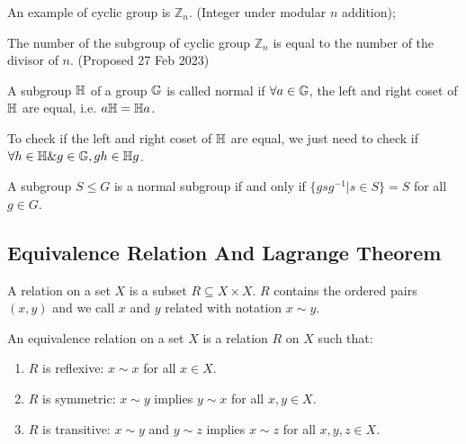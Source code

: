\documentclass[../note.tex]{subfiles}
\begin{document}
\begin{example}
An example of cyclic group is $\mathbb{Z}_n$. (Integer under modular $n$ addition);
\end{example}

\begin{proposition}
	The number of the subgroup of cyclic group $\mathbb{Z}_n$ is equal to the number of the divisor of $n$. (Proposed 27 Feb 2023)
\end{proposition}

\begin{definition}\label{def:normal_group}\hypertarget{def:normal_group}{}
	A subgroup $\mathbb{H}$ of a group $\mathbb{G}$ is called normal if $\forall a \in \mathbb{G}$, the left and right coset of $\mathbb{H}$ are equal, i.e. $a \mathbb{H}=\mathbb{H}a$.
\end{definition}

To check if the left and right coset of $\mathbb{H}$ are equal, we just need to check if $\forall h \in \mathbb{H} \& g \in \mathbb{G}, gh \in \mathbb{H}g$.

\begin{theorem}
	A subgroup $S \leq G$ is a normal subgroup if and only if $\{gsg^{-1}|s\in S\}=S$ for all $g \in G$.
\end{theorem}

\subsection{Equivalence Relation And Lagrange Theorem}

\begin{definition}[Relation]\label{def:relation}
	A relation on a set $X$ is a subset $R \subseteq X\times X$. $R$ contains the ordered pairs $(x,y)$ and we call $x$ and $y$ related with notation $x \sim y$.
\end{definition}

\begin{definition} 
An equivalence relation on a set $X$ is a relation $R$ on $X$ such that:
\begin{enumerate}
\item $R$ is reflexive: $x \sim x$ for all $x \in X$.
\item $R$ is symmetric: $x \sim y$ implies $y \sim x$ for all $x,y \in X$.
\item $R$ is transitive: $x \sim y$ and $y \sim z$ implies $x \sim z$ for all $x,y,z \in X$.
\end{enumerate}
\end{definition}
\end{document}
